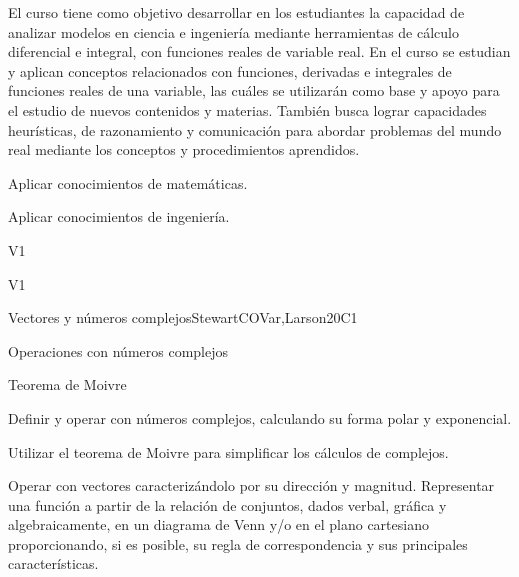 \begin{syllabus}


\begin{justification}
El curso tiene como objetivo desarrollar en los estudiantes la capacidad de analizar modelos en ciencia e ingeniería mediante herramientas de cálculo
diferencial e integral, con funciones reales de variable real.
En el curso se estudian y aplican conceptos relacionados con funciones, derivadas e integrales de funciones reales de una variable, las cuáles se utilizarán como base y apoyo para el estudio de nuevos contenidos y materias.
También busca lograr capacidades heurísticas, de razonamiento y comunicación para abordar problemas del mundo real mediante los conceptos y procedimientos aprendidos.
\end{justification}

\begin{goals}
\item Aplicar conocimientos de matemáticas.
\item Aplicar conocimientos de ingeniería.

\end{goals}

\begin{outcomes}{V1}
   \item {}
   \item {}
\end{outcomes}

\begin{competences}{V1}
   \item {}
   \item {}
   \item {}
\end{competences}

\begin{unit}{Vectores y números complejos}{}{StewartCOVar,Larson}{20}{C1}
   \begin{topics}
      \item Operaciones con números complejos
      \item Teorema de Moivre \textquotesingle
   \end{topics}

   \begin{learningoutcomes}
      \item Definir y operar con números complejos, calculando su forma polar y exponencial.
      \item Utilizar el teorema de Moivre \textquotesingle para simplificar los cálculos de complejos.
      \item Operar con vectores caracterizándolo por su dirección y magnitud.  Representar una función a partir de la relación de conjuntos,  dados verbal, gráfica y algebraicamente,  en un diagrama de Venn  y/o en el plano cartesiano proporcionando, si es posible, su regla de correspondencia  y sus principales características.
   \end{learningoutcomes}
\end{unit}


\end{syllabus}
